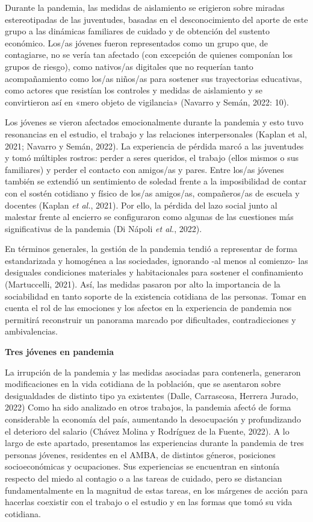 Durante la pandemia, las medidas de aislamiento se erigieron sobre miradas estereotipadas de las juventudes, basadas en el desconocimiento del aporte de este grupo a las dinámicas familiares de cuidado y de obtención del sustento económico. Los/as jóvenes fueron representados como un grupo que, de contagiarse, no se vería tan afectado (con excepción de quienes componían los grupos de riesgo), como nativos/as digitales que no requerían tanto acompañamiento como los/as niños/as para sostener sus trayectorias educativas, como actores que resistían los controles y medidas de aislamiento y se convirtieron así en «mero objeto de vigilancia» (Navarro y Semán, 2022: 10).

Los jóvenes se vieron afectados emocionalmente durante la pandemia y esto tuvo resonancias en el estudio, el trabajo y las relaciones interpersonales (Kaplan et al, 2021; Navarro y Semán, 2022). La experiencia de pérdida marcó a las juventudes y tomó múltiples rostros: perder a seres queridos, el trabajo (ellos mismos o sus familiares) y perder el contacto con amigos/as y pares. Entre los/as jóvenes también se extendió un sentimiento de soledad frente a la imposibilidad de contar con el sostén cotidiano y físico de los/as amigos/as, compañeros/as de escuela y docentes (Kaplan \emph{et al.}, 2021). Por ello, la pérdida del lazo social junto al malestar frente al encierro se configuraron como algunas de las cuestiones más significativas de la pandemia (Di Nápoli \emph{et al.}, 2022).

En términos generales, la gestión de la pandemia tendió a representar de forma estandarizada y homogénea a las sociedades, ignorando -al menos al comienzo- las desiguales condiciones materiales y habitacionales para sostener el confinamiento (Martuccelli, 2021). Así, las medidas pasaron por alto la importancia de la sociabilidad en tanto soporte de la existencia cotidiana de las personas. Tomar en cuenta el rol de las emociones y los afectos en la experiencia de pandemia nos permitirá reconstruir un panorama marcado por dificultades, contradicciones y ambivalencias.

\textbf{Tres jóvenes en pandemia}

La irrupción de la pandemia y las medidas asociadas para contenerla, generaron modificaciones en la vida cotidiana de la población, que se asentaron sobre desigualdades de distinto tipo ya existentes (Dalle, Carrascosa, Herrera Jurado, 2022) Como ha sido analizado en otros trabajos, la pandemia afectó de forma considerable la economía del país, aumentando la desocupación y profundizando el deterioro del salario (Chávez Molina y Rodríguez de la Fuente, 2022). A lo largo de este apartado, presentamos las experiencias durante la pandemia de tres personas jóvenes, residentes en el AMBA, de distintos géneros, posiciones socioeconómicas y ocupaciones. Sus experiencias se encuentran en sintonía respecto del miedo al contagio o a las tareas de cuidado, pero se distancian fundamentalmente en la magnitud de estas tareas, en los márgenes de acción para hacerlas coexistir con el trabajo o el estudio y en las formas que tomó su vida cotidiana.

